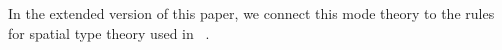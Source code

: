 \documentclass{drl-common/llncs}
\newcommand\F[2]{\ensuremath{F_{#1} \,\, #2}}
\newcommand\U[2]{\ensuremath{U_{#1} \,\, #2}}
\newcommand\seq[3]{\ensuremath{#1 \, [ #2 ] \, \vdash \, #3}}
\renewcommand\irl[1]{\dsd{#1}}
\newcommand\hyp[1]{\ensuremath{\dsd{hyp} \, {#1}}}
\newcommand\UL[3]{\ensuremath{\dsd{UL}^{#1}_{#2}(#3)}}
\newcommand\FR[3]{\ensuremath{\dsd{FR}^{#1}_{#2}(#3)}}
\newcommand\FL[1]{\ensuremath{\dsd{FL}(#1)}}
\newcommand\UR[1]{\ensuremath{\dsd{UR}(#1)}}
\newcommand\Flat[1]{\ensuremath{\flat \, {#1}}}
\newcommand\Sharp[1]{\ensuremath{\sharp \, {#1}}}
\begin{document}
In the extended version of this paper, we connect this mode theory to
the rules for spatial type theory used in
~\citet{shulman15realcohesion}.



\end{document}

